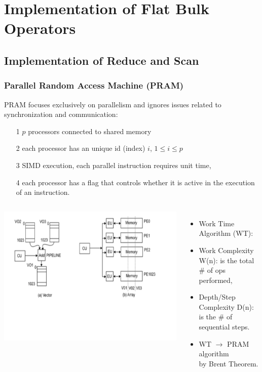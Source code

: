\documentclass{beamer}
\renewcommand{\emph}[1]{\textcolor{structure}{#1}}
\newcommand{\emp}[1]{\textcolor{DikuRed}{ #1}}
\begin{document}
\section{Implementation of Flat Bulk Operators}

\begin{frame}[fragile]
	\tableofcontents[currentsection]
\end{frame}

\subsection{Implementation of Reduce and Scan}

\begin{frame}[fragile,t]
  \frametitle{Parallel Random Access Machine (PRAM)}

PRAM focuses exclusively on parallelism and ignores issues
related to synchronization and communication:
\begin{itemize}
    \item[1] $p$ processors connected to shared memory
    \item[2] each processor has an unique id (index) $i$, $1 \leq i \leq p$
    \item[3] SIMD execution, each parallel instruction requires unit time,
    \item[4] each processor has a flag that controls whether it is active
                in the execution of an instruction.
\end  {itemize}


\begin{columns}
\includegraphics[height=37ex]{Ch1Figs/VectorMachine}
\vspace{-15ex}
\begin{itemize}
    \item \emp{Work Time Algorithm (WT):}
    \item \emp{Work Complexity W(n)}: is the total \# of ops performed,
    \item \emp{Depth/Step Complexity D(n)}: is the \# of sequential steps.\medskip
    \item \emph{WT $\longrightarrow$ PRAM algorithm\\by Brent Theorem}.
\end{itemize}
\end{columns}

\end{frame}
\end{document}
